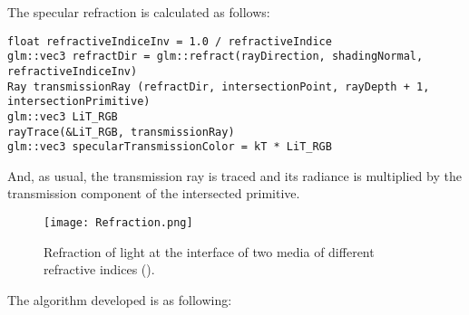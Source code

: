The specular refraction is calculated as follows:

\begin{lstlisting}[caption={Algorithm of Specular Transmission}, captionpos=b, label=Transmission]
float refractiveIndiceInv = 1.0 / refractiveIndice
glm::vec3 refractDir = glm::refract(rayDirection, shadingNormal, refractiveIndiceInv)
Ray transmissionRay (refractDir, intersectionPoint, rayDepth + 1, intersectionPrimitive)
glm::vec3 LiT_RGB
rayTrace(&LiT_RGB, transmissionRay)
glm::vec3 specularTransmissionColor = kT * LiT_RGB
\end{lstlisting}

\iffalse
First, the shading normal is inverted if the origin of the ray was inside a primitive, like a sphere, and if it was not then the refractive index is inverted.
Then, it is calculated two auxiliary scalar projections:
$cosTheta1$
and
$cosTheta2$
.
$cosTheta1$
is the dot product of the inverse of the shading normal and the ray direction, and
$cosTheta2$
is the difference of one and refractive index squared multiplied by one minus
$cosTheta1$
squared.
Then, if
$cosTheta2$
is greater than zero, then the direction of the transmission ray is ray direction multiplied with refractive index plus shading normal multiplied by refractive index multiplied $cosTheta1$
minus square root of 
$cosTheta2$
.
Else, the direction of the transmission ray is just ray direction plus shading normal multiplied by the double of
$cosTheta1$
.
\fi

And, as usual, the transmission ray is traced and its radiance is multiplied by the transmission component of the intersected primitive.

\begin{figure}[H]
	\centering
	\caption{Refraction of light at the interface of two media of different refractive indices (\cite{RTRefractions}).}
	\label{Refraction.}
	\texttt{[image: Refraction.png]}
\end{figure}

\par
The algorithm developed is as following:

